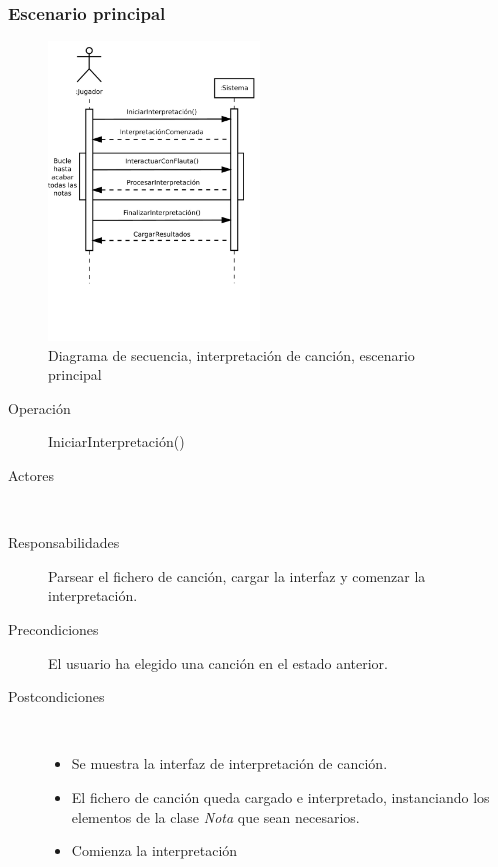 \subsubsection{Escenario principal}
\begin{figure}[h!]
  \centering
  \includegraphics[trim=0cm 8cm 0cm 0cm, clip=true, width=0.5\textwidth]{4_analisis/diagsec_caso3}
  \caption{Diagrama de secuencia, interpretación de canción, escenario principal}
\end{figure}

\begin{description}
\item[Operación] IniciarInterpretación()
\item[Actores] \jugador\, \sistema\
\item[Responsabilidades] Parsear el fichero de canción, cargar la interfaz y
  comenzar la interpretación.
\item[Precondiciones] El usuario ha elegido una canción en el estado anterior.
\item[Postcondiciones] $\quad$
  \begin{itemize}
  \item Se muestra la interfaz de interpretación de canción.
  \item El fichero de canción queda cargado e interpretado, instanciando los
    elementos de la clase \textit{Nota} que sean necesarios.
  \item Comienza la interpretación
  \end{itemize}
\end{description}

